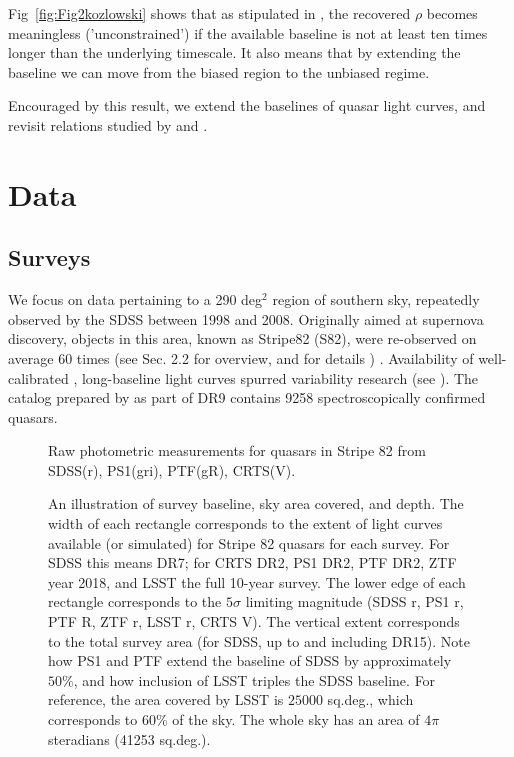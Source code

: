 \documentclass[twocolumn]{aastex62}
\begin{document}
Fig~\ref{fig:Fig2kozlowski} shows that as stipulated in \cite{kozlowski2017a},  the recovered $\rho$ becomes meaningless ('unconstrained') if the available baseline is not at least ten times longer than the underlying timescale. It also means that by extending the baseline we can move from the biased region to the unbiased regime. 

Encouraged by this result, we extend the baselines of  quasar light curves, and revisit relations studied by  \cite{macleod2011} and \cite{hernitschek2016}. 

\section{Data}
\subsection{Surveys}
We focus on data pertaining to a 290 deg$^{2}$ region of southern sky, repeatedly observed by the SDSS between 1998 and 2008. Originally aimed at supernova discovery, objects in this area, known as Stripe82 (S82), were  re-observed on average 60 times (see \citealt{macleod2012} Sec. 2.2 for overview, and \citealt{annis2014} for details ) . Availability of well-calibrated \citep{ivezic2007}, long-baseline light curves spurred variability research (see \citealt{sesar2007}). The catalog prepared by \citep{schneider2008} as part of DR9  contains 9258 spectroscopically confirmed quasars.  

\begin{figure}%
\caption{Raw photometric measurements for quasars in Stripe 82 from SDSS(r),  PS1(gri),  PTF(gR), CRTS(V).}
\label{fig:rawBaselines}
\end{figure} 

\begin{figure*}
\caption{An illustration of survey baseline, sky area covered, and depth. The width of each rectangle corresponds to the extent of light curves available (or simulated) for Stripe 82 quasars for each survey. For SDSS this means DR7; for CRTS DR2, PS1 DR2, PTF DR2, ZTF year 2018, and LSST the full 10-year survey. The lower edge of each rectangle corresponds to the $5\sigma$ limiting magnitude (SDSS r, PS1 r, PTF R, ZTF r, LSST r, CRTS V). The vertical extent corresponds to the total survey area (for SDSS, up to and including DR15).  Note how PS1 and PTF extend the baseline of SDSS by approximately $50\%$, and how inclusion of LSST triples the SDSS baseline. For reference, the area covered by LSST is $25 000$ sq.deg., which corresponds to  $60\%$ of the sky. The whole sky has an area of $4\pi$ steradians (41253 sq.deg.).}
\label{fig:lcExtent}
\end{figure*} 
\end{document}
